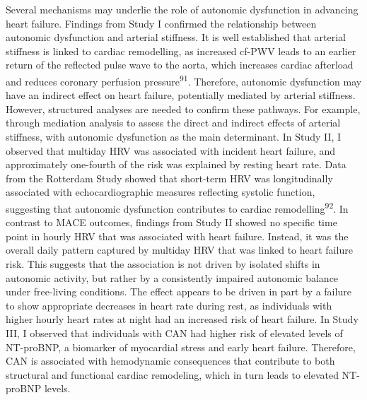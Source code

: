 \documentclass[
  a4paper,
  headsepline=true,
  open=any]{scrbook}
\begin{document}
Several mechanisms may underlie the role of autonomic dysfunction in
advancing heart failure. Findings from Study I confirmed the
relationship between autonomic dysfunction and arterial stiffness. It is
well established that arterial stiffness is linked to cardiac
remodelling, as increased cf-PWV leads to an earlier return of the
reflected pulse wave to the aorta, which increases cardiac afterload and
reduces coronary perfusion pressure\textsuperscript{91}. Therefore,
autonomic dysfunction may have an indirect effect on heart failure,
potentially mediated by arterial stiffness. However, structured analyses
are needed to confirm these pathways. For example, through mediation
analysis to assess the direct and indirect effects of arterial
stiffness, with autonomic dysfunction as the main determinant. In Study
II, I observed that multiday HRV was associated with incident heart
failure, and approximately one-fourth of the risk was explained by
resting heart rate. Data from the Rotterdam Study showed that short-term
HRV was longitudinally associated with echocardiographic measures
reflecting systolic function, suggesting that autonomic dysfunction
contributes to cardiac remodelling\textsuperscript{92}. In contrast to
MACE outcomes, findings from Study II showed no specific time point in
hourly HRV that was associated with heart failure. Instead, it was the
overall daily pattern captured by multiday HRV that was linked to heart
failure risk. This suggests that the association is not driven by
isolated shifts in autonomic activity, but rather by a consistently
impaired autonomic balance under free-living conditions. The effect
appears to be driven in part by a failure to show appropriate decreases
in heart rate during rest, as individuals with higher hourly heart rates
at night had an increased risk of heart failure. In Study III, I
observed that individuals with CAN had higher risk of elevated levels of
NT-proBNP, a biomarker of myocardial stress and early heart failure.
Therefore, CAN is associated with hemodynamic consequences that
contribute to both structural and functional cardiac remodeling, which
in turn leads to elevated NT-proBNP levels.
\end{document}
